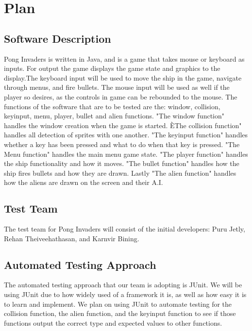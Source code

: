 \documentclass[12pt, titlepage]{article}
\begin{document}
\section{Plan}
	
\subsection{Software Description}
Pong Invaders is written in Java, and is a game that takes mouse or keyboard as
inputs. For output the game displays the game state and graphics to the
display.The keyboard input will be used to move the ship in the game, navigate
through
menus, and fire bullets. The mouse input will be used as well if the player so
desires, as the controls in game can be rebounded to the mouse. The functions
of the %
software that are to be tested are the: window, collision, keyinput,
menu,%
 player, bullet and alien functions. "The window function" handles the window
creation when the game is started. ÈThe collision function" handles all detection of sprites
with one another. "The keyinput function" handles whether a key has been pressed and what to
do when that key is pressed. "The Menu function" handles the main menu game state. "The player function"
handles the ship functionality and how it moves. "The bullet function" handles how the ship
fires
bullets and how they are drawn. Lastly "The alien function" handles how the
aliens are drawn on the screen and their A.I.

\subsection{Test Team}
The test team for Pong Invaders will consist of the initial developers: Puru
Jetly, Rehan Theiveehathasan, and Karnvir Bining.


\subsection{Automated Testing Approach}
The automated testing approach that our team is adopting is JUnit. We will be
using JUnit due to how widely used of a framework it is, as well as how easy it
is to learn%
 and implement. We plan on using JUnit to automate testing for %
the collision function, the alien function, and the keyinput function to see if those functions output the correct
type and expected values to other functions.
\end{document}
